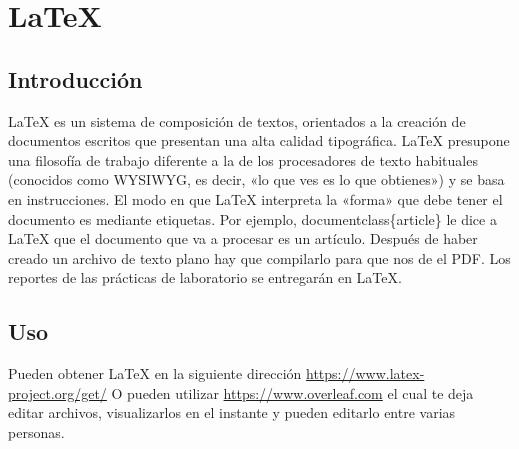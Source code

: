 \documentclass[11pt]{article}
\begin{document}
\section{\LaTeX{}}
\label{sec:org5f3d16c}
\subsection{Introducción}
\label{sec:org9f532b1}
\LaTeX{} es un sistema de composición de textos, orientados a la creación de documentos escritos que presentan una alta calidad tipográfica.
\LaTeX{} presupone una filosofía de trabajo diferente a la de los procesadores de texto habituales (conocidos como WYSIWYG, es decir, «lo que ves es lo que obtienes») y se basa en instrucciones. 
El modo en que \LaTeX{} interpreta la «forma» que debe tener el documento es mediante etiquetas. Por ejemplo, documentclass\{article\} le dice a \LaTeX{} que el documento que va a procesar es un artículo.
Después de haber creado un archivo de texto plano hay que compilarlo para que nos de el PDF.
Los reportes de las prácticas de laboratorio se entregarán en \LaTeX{}.
\subsection{Uso}
\label{sec:org2b4f564}
Pueden obtener \LaTeX{} en la siguiente dirección \url{https://www.latex-project.org/get/}
O pueden utilizar \url{https://www.overleaf.com} el cual te deja editar archivos, 
visualizarlos en el instante y  pueden editarlo entre varias personas.
\end{document}
